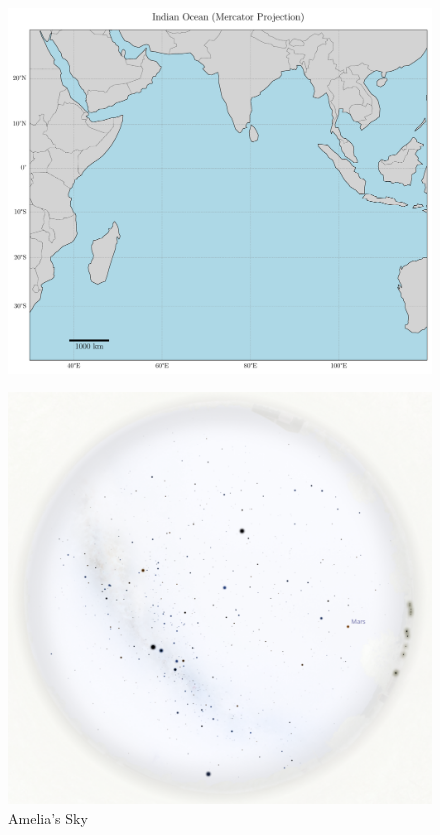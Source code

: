 \documentclass[a4paper,12pt]{extarticle}
\begin{document}
\begin{figure}[H]
	\centering
	\includegraphics[width =\linewidth]{indian.pdf}
	\caption{}
	\label{indian_ocean}
\end{figure}
\clearpage
\begin{figure}[H]
	\centering
	\includegraphics[width =\linewidth]{amelia.png}
	\caption{Amelia's Sky}
	\label{amelia_map}
\end{figure}
\end{document}
